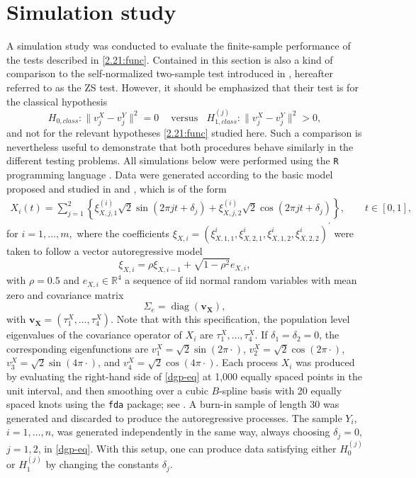 \documentclass[11pt]{article}
\numberwithin{equation}{section}
\numberwithin{theorem}{section}
\numberwithin{lemma}{section}
\numberwithin{proposition}{section}
\numberwithin{cor}{section}
\numberwithin{definition}{section}
\numberwithin{cons}{section}
\numberwithin{rem}{section}
\numberwithin{exa}{section}
\numberwithin{table}{section}
\numberwithin{figure}{section}
\numberwithin{algo}{section}
\begin{document}
{{\section{Simulation study}\label{sec-simul}
\def\theequation{3.\arabic{equation}}
\setcounter{equation}{0}

A simulation study was conducted to evaluate the finite-sample performance of the tests described in \eqref{2.21:func}. Contained in this section is also a
kind of  comparison to the self-normalized two-sample test  introduced in  \cite{zhangshao2015}, hereafter referred to as the ZS test.
However, it should be emphasized that their test is for the classical hypothesis
\begin{equation}  \label{class}
H_{0,class} \colon \| v^X_j - v^Y_j  \|^2 =0
    ~~~~\mbox{ versus} ~~~~
    H^{(j)}_{1,class} \colon\| v^X_j - v^Y_j  \|^2  >0 ,
\end{equation}
 and not for the relevant hypotheses  \eqref{2.21:func} studied here. Such a comparison is nevertheless  useful to demonstrate that  both procedures behave similarly  in the different testing problems.
All simulations below were performed using the {\tt R} programming language \citep{rcore:2016}. Data were generated according to the basic model proposed and studied in \cite{panaretos:2010} and \cite{zhangshao2015}, which is of the form
%
\begin{align}\label{dgp-eq}
X_i(t)= \sum_{j=1}^{2}\left\{\xi_{X,j, 1}^{(i)} \sqrt{2} \sin \left(2 \pi j t+\delta_{j}\right)+\xi_{X , j, 2}^{(i)} \sqrt{2} \cos \left(2 \pi j t+\delta_{j}\right)\right\}, \qquad t \in[0,1],
\end{align}
for $i=1,\ldots,m,$ where the coefficients $\xi_{X,i}=(\xi_{X,1,1}^{i}, \xi_{X,2,1}^{i}, %
\xi_{X,1,2}^{i}, \xi_{X,2,2}^{i}%
)^{\prime}$ were taken to follow a vector autoregressive model
$$
\xi_{X,i}=\rho \xi_{X,i-1}+\sqrt{1-\rho^{2}} e_{X,i},
$$
with $\rho=0.5$ and $e_{X,i} \in \mathbb{R}^{4}$ a sequence of iid %
normal random variables with mean zero and covariance matrix
$$
\Sigma_{e}= \operatorname{diag}(\mathbf{v_X}),
$$
with $\mathbf{v_X}=(\tau_1^{X},\ldots,\tau_4^{X})$.  Note that with this specification, the population level eigenvalues of the covariance operator of $X_i$ are $\tau_1^{X},\ldots,\tau_4^{X}$. If  $\delta_1=\delta_2=0$, the corresponding eigenfunctions are $v_1^X=\sqrt{2} \sin \left(2 \pi \cdot\right)$, $v_2^X=\sqrt{2}\cos \left(2 \pi \cdot\right)$, $v_3^X=\sqrt{2} \sin \left(4 \pi \cdot\right)$, and $v_4^X=\sqrt{2}\cos \left(4 \pi \cdot\right)$.  Each process $X_i$ was produced by evaluating the right-hand side of \eqref{dgp-eq} at 1{,}000 equally spaced points in the unit interval, and then smoothing over a cubic $B$-spline basis with 20 equally spaced knots using the {\tt fda} package; see \cite{ramsay:hooker:graves:2009}. A burn-in sample of length 30 was generated and discarded to produce the autoregressive processes. The sample  $Y_i$, $i=1,\ldots,n$, was generated independently in the same way, always choosing $\delta_j=0$, $j=1,2$, in \eqref{dgp-eq}. With this setup, one can produce data satisfying either $H_0^{(j)}$ or $H_1^{(j)}$ by changing the constants $\delta_j$.

}}
\end{document}
